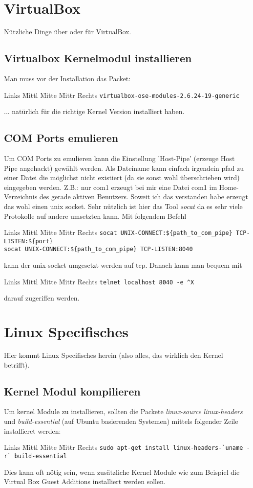 \documentclass[12pt]{article}
\newenvironment{code}{\begin{tabbing}Links \= Mittl \= Mitte \= Mittr \= Rechts \kill}{\end{tabbing}}
\begin{document}
\section{VirtualBox}
Nützliche Dinge über oder für VirtualBox.
\subsection{Virtualbox Kernelmodul installieren}
Man muss vor der Installation das Packet:
\begin{code}
  \> \verb#virtualbox-ose-modules-2.6.24-19-generic# 
\end{code}
... natürlich für die richtige Kernel Version installiert haben.

\subsection{COM Ports emulieren}
Um COM Ports zu emulieren kann die Einstellung 'Host-Pipe' (erzeuge Host Pipe angehackt)
gewählt werden. Als Dateiname kann einfach irgendein pfad zu einer Datei die möglichst nicht
existiert (da sie sonst wohl überschrieben wird) eingegeben werden.
Z.B.: nur com1 erzeugt bei mir eine Datei com1 im Home-Verzeichnis des gerade aktiven Benutzers.
Soweit ich das verstanden habe erzeugt das wohl einen unix socket. Sehr nützlich ist hier das Tool
\textit{socat} da es sehr viele Protokolle auf andere umsetzten kann. Mit folgendem Befehl
\begin{code}
	\> \verb#socat UNIX-CONNECT:${path_to_com_pipe} TCP-LISTEN:${port}# \\
	\> \verb#socat UNIX-CONNECT:${path_to_com_pipe} TCP-LISTEN:8040#
\end{code}
kann der unix-socket umgesetzt werden auf tcp. Danach kann man bequem mit
\begin{code}
	\> \verb#telnet localhost 8040 -e ^X#
\end{code}
darauf zugeriffen werden.

\section{Linux Specifisches}
Hier kommt Linux Specifisches herein (also alles, das wirklich den Kernel betrifft).

\subsection{Kernel Modul kompilieren}
Um kernel Module zu installieren, sollten die Packete \textit{linux-source} \textit{linux-headers} und \textit{build-essential} (auf Ubuntu basierenden Systemen) mittels folgender Zeile installieret werden:
\begin{code}
	\> \verb#sudo apt-get install linux-headers-`uname -r` build-essential#
\end{code}
Dies kann oft nötig sein, wenn zusätzliche Kernel Module wie zum Beispiel die Virtual Box Guest Additions installiert werden sollen.
\end{document}
